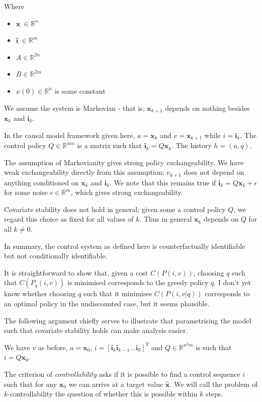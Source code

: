 Where 
\begin{itemize}
    \item $\mathbf{x}_\cdot \in \mathbb{R}^n$
    \item $\mathbf{i}_\cdot \in \mathbb{R}^m$
    \item $A\in \mathbb{R}^{2n}$
    \item $B\in \mathbb{R}^{2m}$
    \item $x(0)\in \mathbb{R}^n$ is some constant
\end{itemize}

We assume the system is Markovian - that is, $\mathbf{x}_{k+1}$ depends on nothing besides $\mathbf{x}_k$ and $\mathbf{i}_k$. 

In the causal model framework given here, $a=\mathbf{x}_k$ and $v=\mathbf{x}_{k+1}$ while $i=\mathbf{i}_k$. The control policy $Q\in \mathbb{R}^{nm}$ is a matrix such that $\mathbf{i}_k = Q\mathbf{x}_k$. The history $h=(a,q)$.

The assumption of Markovianity gives strong policy exchangeability. We have weak exchangeability directly from this assumption: $v_{k+1}$ does not depend on anything conditioned on $\mathbf{x}_k$ and $\mathbf{i}_k$. We note that this remains true if $\mathbf{i}_k = Q\mathbf{x}_k + \epsilon$ for some noise $\epsilon \in \mathbb{R}^m$, which gives strong exchangeability.

Covariate stability does not hold in general; given some a control policy $Q$, we regard this choice as fixed for all values of $k$. Thus in general $\mathbf{x}_k$ depends on $Q$ for all $k\neq 0$.

In summary, the control system as defined here is counterfactually identifiable but not conditionally identifiable.

It is straightforward to show that, given a cost $C(P(i,v))$, choosing $q$ such that $C(P_q(i,v))$ is minimised corresponds to the greedy policy $q$. I don't yet know whether choosing $q$ such that it minimises $C(P(i,v|q))$ corresponds to an optimal policy in the undiscounted case, but it seems plausible.

The following argument chiefly serves to illustrate that parametrising the model such that covariate stability holds can make analysis easier.

We have $v$ as before, $a=\mathbf{x}_0$, $i=[\mathbf{i}_k \mathbf{i}_{k-1} ... \mathbf{i}_0]^T$ and $Q\in \mathbb{R}^{n^2m}$ is such that $i = Q \mathbf{x}_0$.

The criterion of \emph{controllability} asks if it is possible to find a control sequence $i$ such that for any $\mathbf{x}_0$ we can arrive at a target value $\hat{\mathbf{x}}$. We will call the problem of $k$-controllability the question of whether this is possible within $k$ steps.

